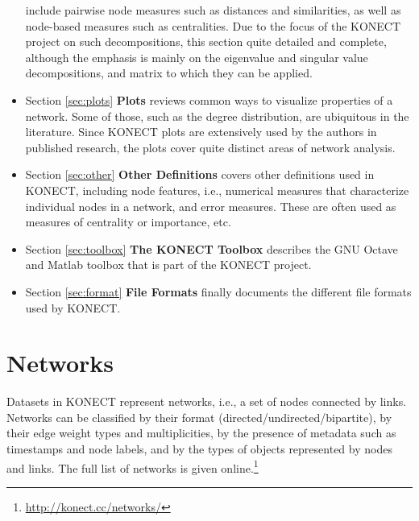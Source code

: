 \documentclass{article}
\begin{document}
\begin{itemize}
  include pairwise node measures such as distances and similarities, as
  well as node-based measures such as centralities.  Due to the focus of
  the KONECT project on such decompositions, this section quite detailed
  and complete, although the emphasis is mainly on the eigenvalue and
  singular value decompositions, and matrix to which they can be
  applied. 
\item Section \ref{sec:plots} \textbf{Plots} reviews common ways to
  visualize properties of a network.  Some of those, such as the degree
  distribution, are ubiquitous in the literature.  Since KONECT plots
  are extensively used by the authors in published research, the plots
  cover quite distinct areas of network analysis. 
\item Section \ref{sec:other} \textbf{Other Definitions} covers other
  definitions used in KONECT, including node features,
  i.e., numerical measures that characterize individual nodes in a
  network, and error measures.  These are often used as measures of centrality or
  importance, etc. 
\item Section \ref{sec:toolbox} \textbf{The KONECT Toolbox} describes the GNU
  Octave and Matlab toolbox that is part of the KONECT project. 
\item Section \ref{sec:format} \textbf{File Formats} finally documents the
  different file formats used by KONECT. 
\end{itemize}

\section{Networks}
\label{sec:taxonomy}
Datasets in KONECT represent networks, i.e., a set of nodes connected by
links. Networks can be classified by their format
(directed/undirected/bipartite), by their edge weight types and
multiplicities, by the 
presence of metadata such as timestamps and node labels, and by
the types of objects represented by nodes and links. 
The full list of networks is given
online.\footnote{\href{http://konect.cc/networks/}{http://konect.cc/networks/}}  
\end{document}
